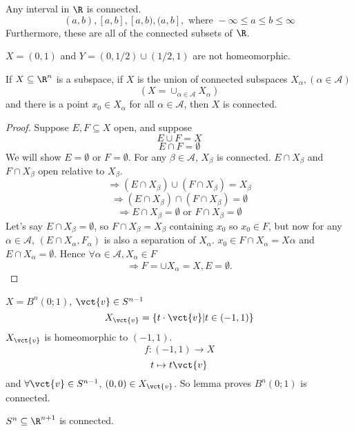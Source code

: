 \begin{theorem}
  Any interval in $\R$ is connected.
  $$(a,b), [a,b], [a,b), (a,b], \text{ where }-\infty \leq a \leq b \leq \infty$$
  Furthermore, these are all of the connected subsets of $\R$.
\end{theorem}

\begin{example}
  $X=(0,1)$ and $Y=(0,1/2)\cup (1/2,1)$ are not homeomorphic.
\end{example}
\begin{lemma}
  If $X\subseteq \R^n$ is a subspace, if $X$ is the union of connected subspaces $X_\alpha, (\alpha\in \mathcal{A})$
    $$\left(X=\cup_{\alpha \in \mathcal{A}}X_\alpha\right)$$
  and there is a point $x_0\in X_\alpha$ for all $\alpha\in \mathcal{A}$, then $X$ is connected.
\end{lemma}
\begin{proof}
  Suppose $E,F\subseteq X$ open, and suppose
    $$E\cup F = X$$
    $$E \cap F= \emptyset$$
 We will show $E=\emptyset$ or $F=\emptyset$. For any $\beta\in \mathcal{A}$, $X_\beta$ is connected.
    $E\cap X_\beta $ and $F\cap X_\beta$ open relative to $X_\beta$.
      $$\Rightarrow (E\cap X_\beta) \cup (F\cap X_\beta)=X_\beta$$
      $$\Rightarrow (E\cap X_\beta) \cap (F \cap X_\beta)=\emptyset$$
      $$\Rightarrow E\cap X_\beta=\emptyset \text{ or } F\cap X_\beta=\emptyset$$
    Let's say $E\cap X_\beta =\emptyset$, so $F\cap X_\beta=X_\beta$ containing $x_0$ so $x_0\in F$, but now for any $\alpha\in \mathcal{A}$, $(E\cap X_\alpha, F_\alpha)$ is also a separation of $X_\alpha.$ $x_0\in F\cap X_\alpha=X\alpha$ and $E\cap X_\alpha =\emptyset$. Hence $\forall \alpha\in \mathcal{A}, X_\alpha \in F$
    $$\Rightarrow F=\cup X_\alpha = X, E=\emptyset.$$
  \qedhere
\end{proof}

\begin{example}
  $X=B^n(0;1)$, $\vct{v}\in S^{n-1}$
  $$X_{\vct{v}}= \{t\cdot \vct{v} | t\in (-1,1) \}$$
  $X_{\vct{v}}$ is homeomorphic to $(-1,1)$.
  $$f: (-1,1) \to X$$
  $$t\mapsto t\vct{v}$$
  and $\forall \vct{v}\in S^{n-1}$, $(0,0)\in X_{\vct{v}}$. So lemma proves $B^n(0;1)$ is connected.
\end{example}

\begin{example}
  $S^{n}\subseteq \R^{n+1}$ is connected.
\end{example}

